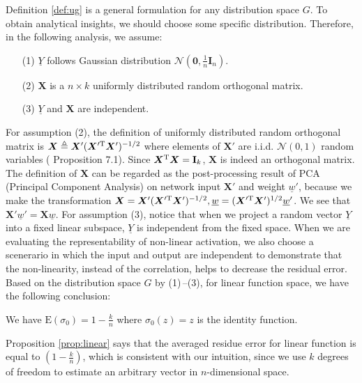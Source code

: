 \documentclass[appliedmath,article,accept,pdftex,moreauthors]{Definitions/mdpi}
\begin{document}
Definition \ref{def:ug} is a general formulation for any distribution space $G$.
To obtain analytical insights, we should choose some specific distribution.
Therefore, in the following analysis, we assume:
\begin{enumerate}[label={\arabic*)}]
\item [(1)]$\underline{Y}$ follows Gaussian distribution $\mathcal{N}(\mathbf{0},\frac{1}{n} \mathbf{I}_n)$.
\item [(2)] $\bm{X}$ is a $n\times k$ uniformly distributed random orthogonal matrix.
\item  [(3)]$\underline{Y}$ and $\bm{X}$ are independent.
\end{enumerate}

For assumption (2), the definition of uniformly distributed random orthogonal matrix is $\bm{X} \triangleq \bm{X}'(\bm{X}'^{\mathrm{T}}\bm{X}')^{-1/2}$
where elements of $\bm{X}'$ are i.i.d. $\mathcal{N}(0, 1)$ random variables (\cite{eaton1989group} Proposition 7.1).
Since $\bm{X}^{\mathrm{T}}\bm{X} = \mathbf{I}_k$, $\bm{X}$ is indeed an orthogonal matrix.
The definition of $\bm{X}$ can be regarded as the post-processing result of PCA (Principal Component Analysis)
on network input $\bm{X}'$ and weight $\underline{w}'$, because
we make the transformation $\bm{X} = \bm{X}'(\bm{X}'^{\mathrm{T}}\bm{X}')^{-1/2}, \underline{w} = (\bm{X}'^{\mathrm{T}}\bm{X}')^{1/2}\underline{w}'$.
We see that $\bm{X}'\underline{w}' = \bm{X}\underline{w}$.
For assumption (3), notice that when we project a random vector $\underline{Y}$ into a fixed linear subspace,
$\underline{Y}$ is independent from the fixed space.
When we are evaluating the representability of non-linear activation, we also choose a scenerario in which the input and output are independent
to demonstrate that the non-linearity, instead of the correlation, helps to decrease the residual error.
Based on the distribution space $G$ by (1)\,--(3), for linear function space, we have the following conclusion:

\begin{Proposition}\label{prop:linear}
We have $\mathrm{E}(\sigma_0) = 1 - \frac{k}{n}$ where $\sigma_0(z) = z$ is the identity function.
\end{Proposition}

Proposition \ref{prop:linear} says that the averaged residue error for linear function is equal to $(1-\frac{k}{n})$,
which is consistent with our intuition, 
since we use $k$ degrees of freedom to estimate an arbitrary vector in $n$-dimensional space.
\end{document}
